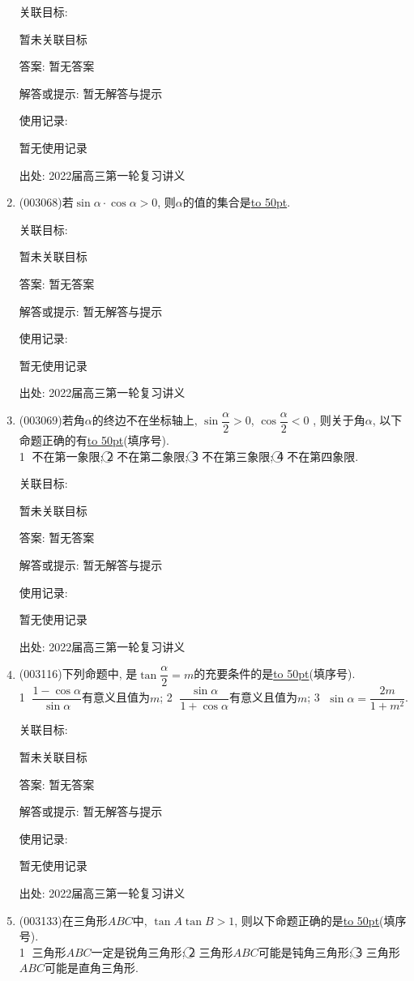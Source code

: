 \documentclass[10pt,a4paper]{article}
\newcommand{\blank}[1]{\underline{\hbox to #1pt{}}}
\begin{document}
\begin{enumerate}[1.]
关联目标:

暂未关联目标

答案: 暂无答案

解答或提示: 暂无解答与提示

使用记录:

暂无使用记录


出处: 2022届高三第一轮复习讲义
\item { (003068)}若$\sin\alpha\cdot\cos\alpha>0$, 则$\alpha$的值的集合是\blank{50}.


关联目标:

暂未关联目标

答案: 暂无答案

解答或提示: 暂无解答与提示

使用记录:

暂无使用记录


出处: 2022届高三第一轮复习讲义
\item { (003069)}若角$\alpha$的终边不在坐标轴上, $\sin\dfrac{\alpha}2>0$, $\cos\dfrac{\alpha}2<0$ , 则关于角$\alpha$, 以下命题正确的有\blank{50}(填序号).\\
\textcircled{1} 不在第一象限; \textcircled{2} 不在第二象限; \textcircled{3} 不在第三象限; \textcircled{4} 不在第四象限.


关联目标:

暂未关联目标

答案: 暂无答案

解答或提示: 暂无解答与提示

使用记录:

暂无使用记录


出处: 2022届高三第一轮复习讲义
\item { (003116)}下列命题中, 是$\tan\dfrac{\alpha}2=m$的充要条件的是\blank{50}(填序号).\\
\textcircled{1} $\dfrac{1-\cos \alpha}{\sin \alpha}$有意义且值为$m$; 	\textcircled{2} $\dfrac{\sin \alpha}{1+\cos \alpha}$有意义且值为$m$; \textcircled{3} $\sin \alpha =\dfrac{2m}{1+{m^2}}$.


关联目标:

暂未关联目标

答案: 暂无答案

解答或提示: 暂无解答与提示

使用记录:

暂无使用记录


出处: 2022届高三第一轮复习讲义
\item { (003133)}在三角形$ABC$中, $\tan A\tan B>1$, 则以下命题正确的是\blank{50}(填序号).\\
\textcircled{1} 三角形$ABC$一定是锐角三角形;
\textcircled{2} 三角形$ABC$可能是钝角三角形;
\textcircled{3} 三角形$ABC$可能是直角三角形.



\end{enumerate}
\end{document}

